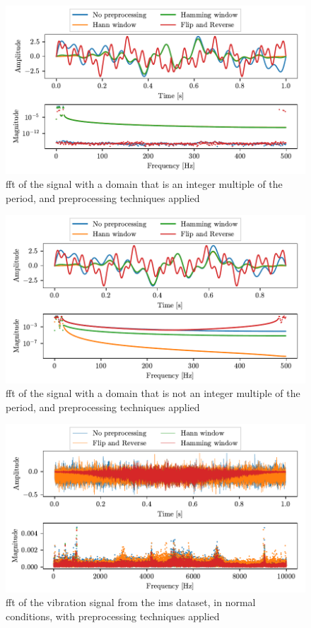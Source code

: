 \begin{figure}
    \centering
    \includegraphics[scale=1]{images/FeatureExtraction/FD_Preproc_sync.pdf}
    \caption{\gls{fft} of the signal  with a domain that is an integer multiple of the period, and preprocessing techniques applied}
    \label{fig:FD_preprocessing}
\end{figure}

\begin{figure}
    \centering
    \includegraphics[scale=1]{images/FeatureExtraction/FD_Preproc_outofsync.pdf}
    \caption{\gls{fft} of the signal with a domain that is not an integer multiple of the period, and preprocessing techniques applied}
    \label{fig:FD_preprocessing_dist}
\end{figure}

\begin{figure}
    \centering
    \includegraphics[scale=1]{images/FeatureExtraction/FD_PreprocIMS.pdf}
    \caption{\gls{fft} of the  vibration signal from the \gls{ims} dataset, in normal conditions, with preprocessing techniques applied}
    \label{fig:IMS}
\end{figure}


